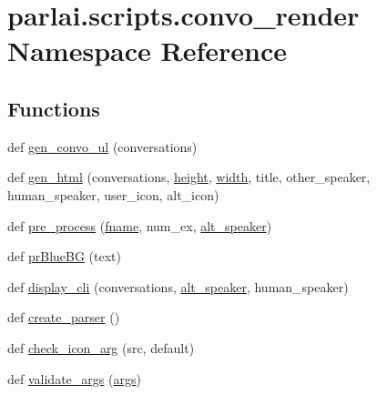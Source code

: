 \hypertarget{namespaceparlai_1_1scripts_1_1convo__render}{}\section{parlai.\+scripts.\+convo\+\_\+render Namespace Reference}
\label{namespaceparlai_1_1scripts_1_1convo__render}
\subsection*{Functions}
\begin{DoxyCompactItemize}
\item 
def \hyperlink{namespaceparlai_1_1scripts_1_1convo__render_a8c393321c36d1cafceb86aa3f7431c4c}{gen\+\_\+convo\+\_\+ul} (conversations)
\item 
def \hyperlink{namespaceparlai_1_1scripts_1_1convo__render_ad23695f4d64e7dbd1fee801098d570b2}{gen\+\_\+html} (conversations, \hyperlink{namespaceparlai_1_1scripts_1_1convo__render_a3ea95c859b230a646a5c6fe5b4586b67}{height}, \hyperlink{namespaceparlai_1_1scripts_1_1convo__render_a9781c43527eb370030ea6f1cafca6a3a}{width}, title, other\+\_\+speaker, human\+\_\+speaker, user\+\_\+icon, alt\+\_\+icon)
\item 
def \hyperlink{namespaceparlai_1_1scripts_1_1convo__render_a0f0a031443ca797c936d2961a702a45e}{pre\+\_\+process} (\hyperlink{namespaceparlai_1_1scripts_1_1convo__render_a0f418727dc35abb2a05311377ef8dc1d}{fname}, num\+\_\+ex, \hyperlink{namespaceparlai_1_1scripts_1_1convo__render_a516a38b04ed5b7cf0c03ed2ea0e99d46}{alt\+\_\+speaker})
\item 
def \hyperlink{namespaceparlai_1_1scripts_1_1convo__render_a21a7681b9803eb6994ac72c7d480cb94}{pr\+Blue\+BG} (text)
\item 
def \hyperlink{namespaceparlai_1_1scripts_1_1convo__render_a68e7e186a59ac2397560d0107f804ff3}{display\+\_\+cli} (conversations, \hyperlink{namespaceparlai_1_1scripts_1_1convo__render_a516a38b04ed5b7cf0c03ed2ea0e99d46}{alt\+\_\+speaker}, human\+\_\+speaker)
\item 
def \hyperlink{namespaceparlai_1_1scripts_1_1convo__render_a4220e40f3e0c5ac320177b6e0f3d8e83}{create\+\_\+parser} ()
\item 
def \hyperlink{namespaceparlai_1_1scripts_1_1convo__render_ac7e3c84a7f6e3b488360319b597eda18}{check\+\_\+icon\+\_\+arg} (src, default)
\item 
def \hyperlink{namespaceparlai_1_1scripts_1_1convo__render_a4078a037f4f5526297e7860fbed9cfb2}{validate\+\_\+args} (\hyperlink{namespaceparlai_1_1scripts_1_1convo__render_a784f93916e4d1bdb5c70adbfb1e29e69}{args})
\end{DoxyCompactItemize}

